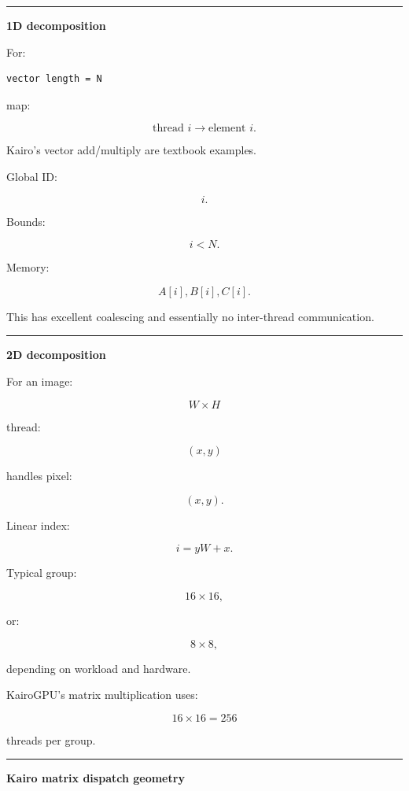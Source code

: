 \begin{center}\rule{0.5\linewidth}{0.5pt}\end{center}

\textbf{1D decomposition}

For:

\protect{}\label{zugmms}%
\begin{verbatim}
vector length = N
\end{verbatim}

map:

\[
\boxed{
\text{thread }i
\rightarrow
\text{element }i.
}
\]

Kairo's vector add/multiply are textbook examples.

Global ID:

\[
i.
\]

Bounds:

\[
i<N.
\]

Memory:

\[
A[i],B[i],C[i].
\]

This has excellent coalescing and essentially no inter-thread communication.

\begin{center}\rule{0.5\linewidth}{0.5pt}\end{center}

\textbf{2D decomposition}

For an image:

\[
W\times H
\]

thread:

\[
(x,y)
\]

handles pixel:

\[
(x,y).
\]

Linear index:

\[
\boxed{
i=yW+x.
}
\]

Typical group:

\[
16\times16,
\]

or:

\[
8\times8,
\]

depending on workload and hardware.

KairoGPU's matrix multiplication uses:

\[
16\times16=256
\]

threads per group.

\begin{center}\rule{0.5\linewidth}{0.5pt}\end{center}

\textbf{Kairo matrix dispatch geometry}

